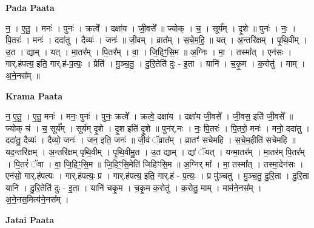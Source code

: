 \documentclass[17pt]{extarticle}
\begin{document}
\textbf{Pada Paata} \newline

न॒ । ए॒तु॒ । मनः॑ । पुनः॑ । क्रत्वे᳚ । दक्षा॑य । जी॒वसे᳚ ॥ ज्योक् । च॒ । सूर्य᳚म् । दृ॒शे ॥ पुनः॑ । नः॒ । पि॒तरः॑ । मनः॑ । ददा॑तु । दैव्यः॑ । जनः॑ ॥ जी॒वम् । व्रात᳚म् । स॒चे॒म॒हि॒ ॥ यत् । अ॒न्तरि॑क्षम् । पृ॒थि॒वीम् । उ॒त । द्याम् । यत् । मा॒तर᳚म् । पि॒तर᳚म् । वा॒ । जि॒हिꣳ॒॒सि॒म ॥ अ॒ग्निः । मा॒ । तस्मा᳚त् । एन॑सः । गार्.ह॑पत्य॒ इति॒ गार्.ह॑-प॒त्यः॒ । प्रेति॑ । मु॒ञ्च॒तु॒ । दु॒रि॒तेति॑ दुः - इ॒ता । यानि॑ । च॒कृ॒म । क॒रोतु॑ । माम् । अ॒ने॒नस᳚म् ॥  \newline


\textbf{Krama Paata} \newline

न॒ ए॒तु॒ । ए॒तु॒ मनः॑ । मनः॒ पुनः॑ । पुनः॒ क्रत्वे᳚ । क्रत्वे॒ दक्षा॑य । दक्षा॑य जी॒वसे᳚ । जी॒वस॒ इति॑ जी॒वसे᳚ ॥ ज्योक् च॑ । च॒ सूर्य᳚म् । सूर्य॑म् दृ॒शे । दृ॒श इति॑ दृ॒शे ॥ पुन॑र्,नः । नः॒ पि॒तरः॑ । पि॒तरो॒ मनः॑ । मनो॒ ददा॑तु । ददा॑तु॒ दैव्यः॑ । दैव्यो॒ जनः॑ । जन॒ इति॒ जनः॑ ॥ जी॒वं ॅव्रात᳚म् । व्रातꣳ॑ सचेमहि । स॒चे॒म॒हीति॑ सचेमहि ॥ यद॒न्तरि॑क्षम् । अ॒न्तरि॑क्षम् पृथि॒वीम् । पृ॒थि॒वीमु॒त । उ॒त द्याम् । द्यां ॅयत् । यन्मा॒तर᳚म् । मा॒तर॑म् पि॒तर᳚म् । पि॒तरं॑ ॅवा । वा॒ जि॒हिꣳ॒॒सि॒म ॥ जि॒हिꣳ॒॒सि॒मेति॑ जिहिꣳसि॒म ॥ अ॒ग्निर् मा᳚ । मा॒ तस्मा᳚त् । तस्मा॒देन॑सः । एन॑सो॒ गार्.ह॑पत्यः । गार्.ह॑पत्यः॒ प्र । गार्.ह॑पत्य॒ इति॒ गार्.ह॑ - प॒त्यः॒ । प्र मु॑ञ्चतु । मु॒ञ्च॒तु॒ दु॒रि॒ता । दु॒रि॒ता यानि॑ । दु॒रि॒तेति॑ दुः - इ॒ता । यानि॑ चकृ॒म । च॒कृ॒म क॒रोतु॑ । क॒रोतु॒ माम् । माम॑ने॒नस᳚म् । अ॒ने॒नस॒मित्य॑ने॒नस᳚म् । \newline

\textbf{Jatai Paata} \newline
\end{document}
